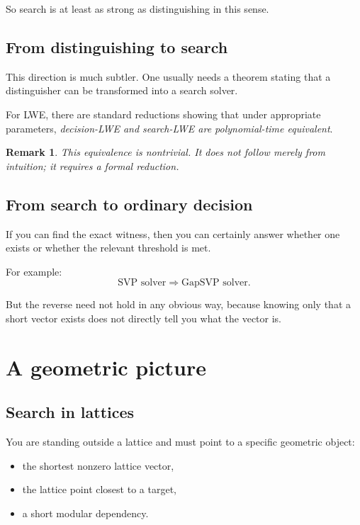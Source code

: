 \documentclass[11pt]{article}
\newtheorem{remark}{Remark}
\begin{document}
	\noindent
	So search is at least as strong as distinguishing in this sense.
	
	\subsection{From distinguishing to search}
	
	This direction is much subtler. One usually needs a theorem stating that a distinguisher can be transformed into a search solver.
	
	For LWE, there are standard reductions showing that under appropriate parameters, \emph{decision-LWE and search-LWE are polynomial-time equivalent}.
	
	\begin{remark}
		This equivalence is nontrivial. It does not follow merely from intuition; it requires a formal reduction.
	\end{remark}
	
	\subsection{From search to ordinary decision}
	
	If you can find the exact witness, then you can certainly answer whether one exists or whether the relevant threshold is met.
	
	For example:
	\[
	\text{SVP solver} \Rightarrow \text{GapSVP solver}.
	\]
	
	But the reverse need not hold in any obvious way, because knowing only that a short vector exists does not directly tell you what the vector is.
	
	\section{A geometric picture}
	
	\subsection{Search in lattices}
	
	You are standing outside a lattice and must point to a specific geometric object:
	\begin{itemize}
		\item the shortest nonzero lattice vector,
		\item the lattice point closest to a target,
		\item a short modular dependency.
	\end{itemize}
	
\end{document}

